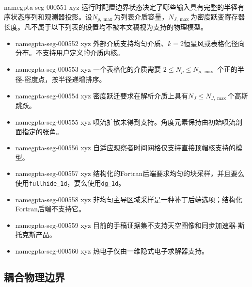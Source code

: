 \documentclass[twocolumn]{aastex702}
\makeatletter
\providecommand{\gptareaderanchor}[1]{\pdfdest name{#1} xyz}%
\providecommand{\gptareaderanchor}[1]{\special{pdf:dest (#1) [ @thispage /XYZ @xpos @ypos null ]}}%
\makeatother
\begin{document}
\gptareaderanchor{gpta-seg-000551}%
运行时配置边界状态决定了哪些输入具有完整的半径有序状态序列和观测器投影。设\(N_{\rho,\max}\)为列表介质容量，\(N_{J,\max}\)为密度跃变寄存器长度。凡不属于以下列表的设置均不被本文稿视为支持的物理模型。
\begin{itemize}
\item
\gptareaderanchor{gpta-seg-000552}%
外部介质支持均匀介质、\(k=2\)恒星风或表格化径向分布。不支持用户定义的介质内核。
\item
\gptareaderanchor{gpta-seg-000553}%
一个表格化的介质需要 \(2\le N_\rho\le N_{\rho,\max}\) 个正的半径-密度点，按半径递增排序。
\item
\gptareaderanchor{gpta-seg-000554}%
密度跃迁要求在解析介质上具有\(N_J\le N_{J,\max}\)个高斯跳跃。
\item
\gptareaderanchor{gpta-seg-000555}%
喷流扩散未得到支持。角度元素保持由初始喷流剖面指定的张角。
\item
\gptareaderanchor{gpta-seg-000556}%
自适应观察者时间网格仅支持直接顶帽核支持的模型。
\item
\gptareaderanchor{gpta-seg-000557}%
结构化的Fortran后端要求均匀的块采样，并且要么使用\texttt{fullhide\_1d}，要么使用\texttt{dg\_1d}。
\item
\gptareaderanchor{gpta-seg-000558}%
非均匀主导区域采样是一种补丁后端选项；结构化Fortran后端不支持它。
\item
\gptareaderanchor{gpta-seg-000559}%
目前的手稿证据集不支持天空图像和同步加速器-斯托克斯产品。
\item
\gptareaderanchor{gpta-seg-000560}%
热电子仅由一维隐式电子求解器支持。
\end{itemize}

\subsection{耦合物理边界}
\end{document}
